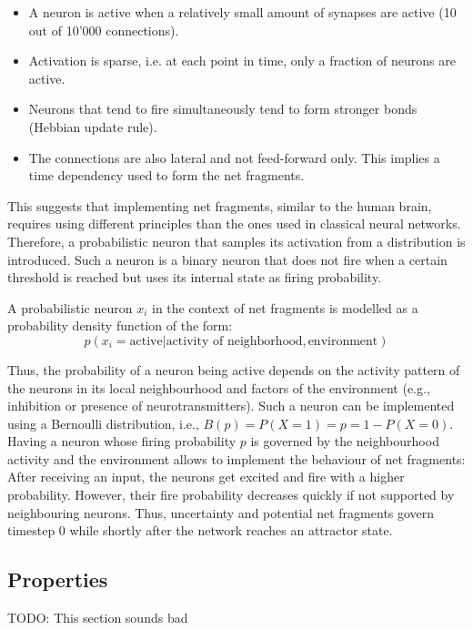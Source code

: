 \begin{itemize}
    \item A neuron is active when a relatively small amount of synapses are active (10 out of 10'000 connections). 
    \item Activation is sparse, i.e. at each point in time, only a fraction of neurons are active.
    \item Neurons that tend to fire simultaneously tend to form stronger bonds (Hebbian update rule).
    \item The connections are also lateral and not feed-forward only. This implies a time dependency used to form the net fragments. 
\end{itemize}


This suggests that implementing net fragments, similar to the human brain, requires using different principles than the ones used in classical neural networks. Therefore, a probabilistic neuron that samples its activation from a distribution is introduced.
Such a neuron is a binary neuron that does not fire when a certain threshold is reached but uses its internal state as firing probability.

A probabilistic neuron $x_i$ in the context of net fragments is modelled as a probability density function of the form:
\begin{equation}
    p(x_i = \text{active} | \text{activity of neighborhood}, \text{environment}) 
\end{equation}

Thus, the probability of a neuron being active depends on the activity pattern of the neurons in its local neighbourhood and factors of the environment (e.g., inhibition or presence of neurotransmitters).
Such a neuron can be implemented using a Bernoulli distribution, i.e., $B(p) = P(X = 1) = p = 1 - P(X=0)$. Having a neuron whose firing probability $p$ is governed by the neighbourhood activity and the environment allows to implement the behaviour of net fragments: After receiving an input, the neurons get excited and fire with a higher probability. However, their fire probability decreases quickly if not supported by neighbouring neurons. Thus, uncertainty and potential net fragments govern timestep 0 while shortly after the network reaches an attractor state. 

\subsection{Properties}
TODO: This section sounds bad

